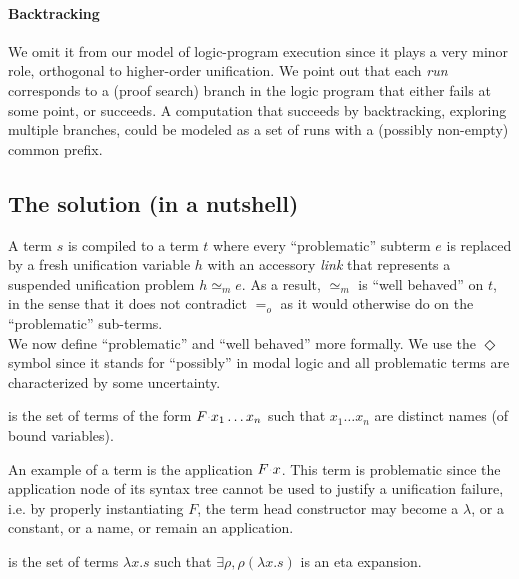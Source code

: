 \documentclass[sigconf,natbib=false,review]{acmart}
\newcommand{\appsep}{\ensuremath{\textcolor{lightgray}{\cdot}}}
\newcommand{\EqualRel}{\ensuremath{=}}
\newcommand{\UnifRel}{\ensuremath{\simeq}}
\newcommand{\Eo}{\ensuremath{\EqualRel_o}\xspace}
\newcommand{\Ue}{\ensuremath{\UnifRel_m}\xspace}
\begin{document}
\paragraph{Backtracking} We omit it from our model of logic-program execution
since it plays a very minor role, orthogonal to higher-order unification.
We point out that each \emph{run} corresponds to a (proof search) branch in the
logic program that either fails at some point, or succeeds. A computation that
succeeds by backtracking, exploring multiple branches, could be
modeled as a set of runs with a (possibly non-empty) common prefix.

\subsection{The solution (in a nutshell)}
\label{sec:nutshell}
A term $s$ is compiled to a term $t$ where every
``problematic'' subterm $e$ is replaced by a fresh unification variable $h$
with an accessory \emph{link} that represents a suspended unification problem
$h \Ue e$. As a result, \Ue is ``well behaved'' on $t$, in the sense that
it does not contradict \Eo as it would otherwise do on the
``problematic'' sub-terms.\\
We now define ``problematic'' and ``well behaved'' more formally.
We use the $\Diamond$ symbol since it stands for ``possibly'' in modal logic
and all problematic terms are characterized by some uncertainty.

\begin{definition}[\maybebeta]\label{def:maybebeta}
  \maybebeta is the set of terms of the form $F \appsep x_1 \ldots x_n$
  such that $x_1 \ldots x_n$ are distinct names (of bound variables).
\end{definition}

\noindent
An example of a \maybebeta{} term is the application $F \appsep x$.
This term is problematic since the application node of 
its syntax tree cannot be used to justify a
unification failure, i.e. by properly instantiating $F$, the term
head constructor may become a $\lambda$, or a constant, or a name, or remain an application.

\begin{definition}[\maybeeta]\label{def:maybeeta}
  \maybeeta is the set of terms $\lambda x.s$ such that $\exists \rho, \rho (\lambda x.s)$
  is an eta expansion. %
\end{definition}
\end{document}
